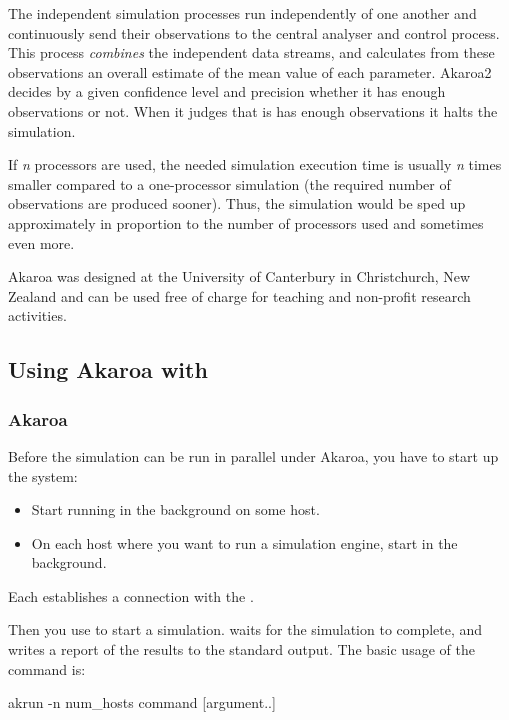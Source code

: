 The independent simulation processes run independently of one another
and continuously send their observations to the central analyser
and control process. This process \textit{combines} the independent data streams,
and calculates from these observations an overall estimate of the mean value
of each parameter.
Akaroa2 decides by a given confidence level and precision
whether it has enough observations or not. When it judges that is
has enough observations it halts the simulation.

If \textit{n} processors are used, the needed simulation execution time
is usually \textit{n} times smaller compared to a one-processor
simulation (the required number of observations are produced sooner).
Thus, the simulation would be sped up approximately in proportion
to the number of processors used and sometimes even more.

Akaroa was designed at the University of Canterbury in Christchurch, New Zealand
and can be used free of charge for teaching and non-profit research activities.


\subsection{Using Akaroa with {\opp}}

\subsubsection{Akaroa}

Before the simulation can be run in parallel under Akaroa, you have to
start up the system:

\begin{itemize}
  \item{Start  running in the background on some host.}
  \item{On each host where you want to run a simulation engine,
     start  in the background.}
\end{itemize}

Each  establishes a connection with the .

Then you use  to start a simulation.  waits
for the simulation to complete, and writes a report of the results
to the standard output. The basic usage of the  command is:

\begin{commandline}
akrun -n num_hosts command [argument..]
\end{commandline}


